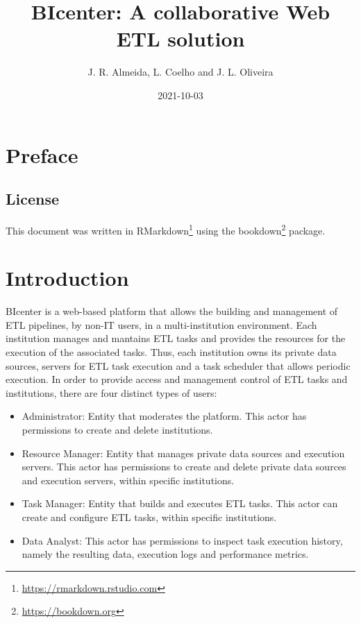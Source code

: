 \documentclass[
  11pt,
]{krantz}
\title{BIcenter: A collaborative Web ETL solution}
\author{J. R. Almeida, L. Coelho and J. L. Oliveira}
\date{2021-10-03}
\providecommand{\tightlist}{%
  \setlength{\itemsep}{0pt}\setlength{\parskip}{0pt}}
\renewcommand{\href}[2]{#2\footnote{\url{#1}}}
\begin{document}
\maketitle

{
\hypersetup{linkcolor=}
\setcounter{tocdepth}{1}
\tableofcontents
}
\listoffigures
\listoftables
\hypertarget{preface}{%
\chapter*{Preface}\label{preface}}


\hypertarget{license}{%
\section*{License}\label{license}}


This document was written in \href{https://rmarkdown.rstudio.com}{RMarkdown} using the \href{https://bookdown.org}{bookdown} package.

\mainmatter

\hypertarget{introduction}{%
\chapter{Introduction}\label{introduction}}

BIcenter is a web-based platform that allows the building and management of ETL pipelines, by non-IT users, in a multi-institution environment. Each institution manages and mantains ETL tasks and provides the resources for the execution of the associated tasks. Thus, each institution owns its private data sources, servers for ETL task execution and a task scheduler that allows periodic execution. In order to provide access and management control of ETL tasks and institutions, there are four distinct types of users:

\begin{itemize}
\tightlist
\item
  Administrator: Entity that moderates the platform. This actor has permissions to create and delete institutions.
\item
  Resource Manager: Entity that manages private data sources and execution servers. This actor has permissions to create and delete private data sources and execution servers, within specific institutions.
\item
  Task Manager: Entity that builds and executes ETL tasks. This actor can create and configure ETL tasks, within specific institutions.
\item
  Data Analyst: This actor has permissions to inspect task execution history, namely the resulting data, execution logs and performance metrics.
\end{itemize}
\end{document}
